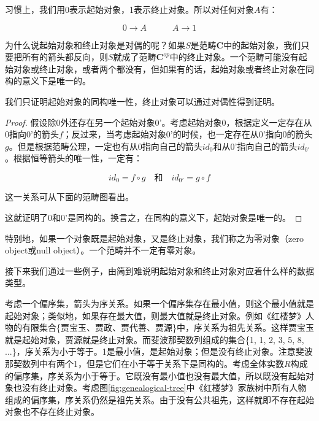 \documentclass[b5paper]{ctexart}
\begin{document}
习惯上，我们用0表示起始对象，1表示终止对象。所以对任何对象$A$有：

\[
  0 \longrightarrow A \quad \quad \quad A \longrightarrow 1
\]

为什么说起始对象和终止对象是对偶的呢？如果$S$是范畴$\pmb{C}$中的起始对象，我们只要把所有的箭头都反向，则$S$就成了范畴$\pmb{C}^{op}$中的终止对象。一个范畴可能没有起始对象或终止对象，或者两个都没有，但如果有的话，起始对象或者终止对象在同构的意义下是唯一的。

我们只证明起始对象的同构唯一性，终止对象可以通过对偶性得到证明。

\begin{proof}
假设除0外还存在另一个起始对象0'。考虑起始对象0，根据定义一定存在从0指向0'的箭头$f$；反过来，当考虑起始对象0'的时候，也一定存在从0'指向0的箭头$g$。但是根据范畴公理，一定也有从0指向自己的箭头$id_0$和从0'指向自己的箭头$id_{0'}$。根据恒等箭头的唯一性，一定有：

\[
  id_0 = f \circ g \quad \text{和} \quad id_{0'} = g \circ f
\]

这一关系可从下面的范畴图看出。

\begin{center}
\end{center}

这就证明了0和0'是同构的。换言之，在同构的意义下，起始对象是唯一的。
\end{proof}

特别地，如果一个对象既是起始对象，又是终止对象，我们称之为零对象（zero object或null object）。一个范畴并不一定有零对象。

接下来我们通过一些例子，由简到难说明起始对象和终止对象对应着什么样的数据类型。

\begin{example}
考虑一个偏序集，箭头为序关系。如果一个偏序集存在最小值，则这个最小值就是起始对象；类似地，如果存在最大值，则最大值就是终止对象。例如《红楼梦》人物的有限集合\{贾宝玉、贾政、贾代善、贾源\}中，序关系为祖先关系。这样贾宝玉就是起始对象，贾源就是终止对象。而斐波那契数列组成的集合\{1, 1, 2, 3, 5, 8, ...\}，序关系为小于等于。1是最小值，是起始对象；但是没有终止对象。注意斐波那契数列中有两个1，但是它们在小于等于关系下是同构的。考虑全体实数$R$构成的偏序集，序关系为小于等于。它既没有最小值也没有最大值，所以既没有起始对象也没有终止对象。考虑图\ref{fig:genealogical-tree}中《红楼梦》家族树中所有人物组成的偏序集，序关系仍然是祖先关系。由于没有公共祖先，这样就即不存在起始对象也不存在终止对象。
\end{example}
\end{document}

